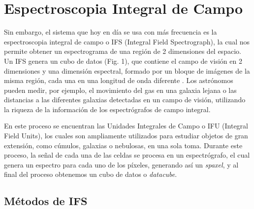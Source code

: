 \documentclass[10pt,twocolumn,a4paper]{opticajnl}
\begin{document}
\section*{Espectroscopia Integral de Campo}
Sin embargo, el sistema que hoy en día se usa con más frecuencia es la espectroscopia integral de campo o IFS (Integral Field Spectrograph), la cual nos permite obtener un espectrograma de una región de 2 dimensiones del espacio. Un IFS genera un cubo de datos (Fig. 1), que contiene el campo de visión en 2 dimensiones y una dimensión espectral, formado por un bloque de imágenes de la misma región, cada una en una longitud de onda diferente \cite{UW-Madison-IFS}. Los astrónomos pueden medir, por ejemplo, el movimiento del gas en una galaxia lejana o las distancias a las diferentes galaxias detectadas en un campo de visión, utilizando la riqueza de la información de los espectrógrafos de campo integral.

En este proceso se encuentran las Unidades Integrales de Campo o IFU (Integral Field Units), los cuales son ampliamente utilizados para estudiar objetos de gran extensión, como cúmulos, galaxias o nebulosas, en una sola toma. Durante este proceso, la señal de cada una de las celdas se procesa en un espectrógrafo, el cual genera un espectro para cada uno de los píxeles, generando así un \textit{spaxel}, y al final del proceso obtenemos un cubo de datos o \textit{datacube}.

\subsection*{Métodos de IFS}
\end{document}

